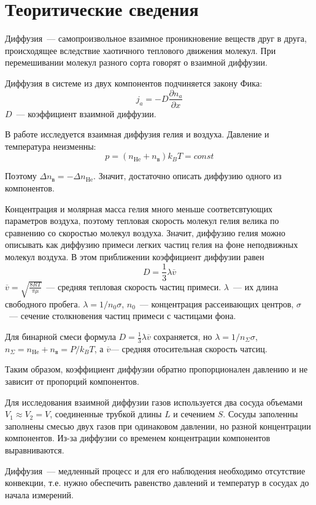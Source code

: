 \section{Теоритические сведения}
Диффузия~--- самопроизвольное взаимное проникновение веществ друг в друга,
происходящее вследствие хаотичного теплового движения молекул. При перемешивании
молекул разного сорта говорят о взаимной диффузии. 

Диффузия в системе из двух компонентов подчиняется закону Фика:
\[j_a=-D\frac{\partial n_a}{\partial x}\]
$D$~--- коэффициент взаимной диффузии.

В работе исследуется взаимная диффузия гелия и воздуха. Давление и температура
неизменны:
\[p=\left(n_\text{He}+n_\text{в}\right)k_BT = const\]

Поэтому $\Delta n_\text{в} = - \Delta n_\text{He}$. Значит, достаточно описать диффузию одного
из компонентов. 

Концентрация и молярная масса гелия много меньше соответсвтующих параметров воздуха,
поэтому тепловая скорость молекул гелия велика по сравнению со скоростью молекул
воздуха. Значит, диффузию гелия можно описывать как диффузию примеси легких частиц 
гелия на фоне неподвижных молекул воздуха. В этом приближении коэффициент диффузии
равен
\[D=\frac{1}{3}\lambda \overline{v}\]
$\overline{v}=\sqrt{\frac{8RT}{\pi\mu}}$~--- средняя тепловая скорость частиц примеси.
$\lambda$~--- их длина свободного пробега. $\lambda = 1/n_0\sigma$,
$n_0$~--- концентрация рассеивающих центров, $\sigma$~--- сечение столкновения
частиц примеси с частицами фона.

Для бинарной смеси формула $D=\frac{1}{3}\lambda \overline{v}$ сохраняется, но
$\lambda=1/n_\Sigma\sigma$, $n_\Sigma=n_\text{He} + n_\text{в} = P/k_BT$, а
$\overline{v}$--- средняя отосительная скорость чатсиц.

Таким образом, коэффициент диффузии обратно пропорционален давлению и не зависит
от пропорций компонентов.

Для исследования взаимной диффузии газов используется два сосуда объемами $V_1\approx V_2=V$,
соединенные трубкой длины $L$ и сечением $S$. Сосуды заполенны заполнены смесью
двух газов при одинаковом давлении, но разной концентрации компонентов. Из-за диффузии
со временем концентрации компонентов выравниваются. 

Диффузия~--- медленный процесс и для его наблюдения необходимо отсутствие конвекции,
т.е. нужно обеспечить равенство давлений и температур в сосудах до начала измерений.

